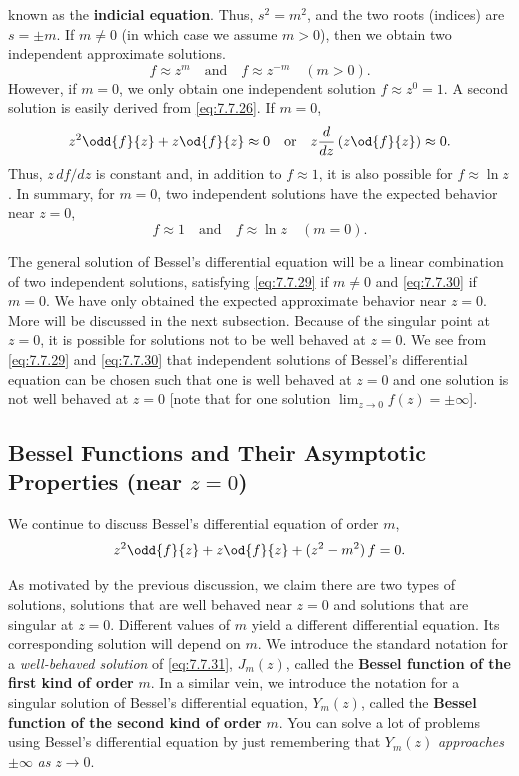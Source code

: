 known as the \textbf{indicial equation}.  Thus, $s^2 = m^2$, and the two roots (indices) are $s = \pm m$.  If $m \neq 0$ (in which case we assume $m > 0$), then we obtain two independent approximate solutions.
\begin{equation}
f \approx z^m \quad\text{and}\quad f \approx z^{-m} \quad (m > 0).
\label{eq:7.7.29}
\end{equation}
However, if $m = 0$, we only obtain one independent solution $f \approx z^0 = 1$.  A second solution is easily derived from \eqref{eq:7.7.26}.  If $m = 0$,
\[
z^2\odd{f}{z} + z\od{f}{z} \approx 0 \quad\text{or}\quad z\frac{d}{d z}\left(z\od{f}{z}\right) \approx 0.
\]
Thus, $z\,df/dz$ is constant and, in addition to $f \approx 1$, it is also possible for $f \approx \ln z$.  In summary, for $m = 0$, two independent solutions have the expected behavior near $z = 0$,
\begin{equation}
f \approx 1 \quad\text{and}\quad f \approx \ln z \quad (m = 0).
\label{eq:7.7.30}
\end{equation}

The general solution of Bessel's differential equation will be a linear combination of two independent solutions, satisfying \eqref{eq:7.7.29} if $m \neq 0$ and \eqref{eq:7.7.30} if $m = 0$.  We have only obtained the expected approximate behavior near $z = 0$.  More will be discussed in the next subsection.  Because of the singular point at $z = 0$, it is possible for solutions not to be well behaved at $z = 0$.  We see from \eqref{eq:7.7.29} and \eqref{eq:7.7.30} that independent solutions of Bessel's differential equation can be chosen such that one is well behaved at $z = 0$ and one solution is not well behaved at $z = 0$ [note that for one solution $\lim_{z\to 0}f(z) = \pm\infty$].

\subsection{Bessel Functions and Their Asymptotic Properties (near \texorpdfstring{$z = 0$}{z = 0})}
\label{sec:7.7.6}

We continue to discuss Bessel's differential equation of order $m$,
\begin{equation}
z^2\odd{f}{z} + z\od{f}{z} + (z^2 - m^2)\,f = 0.
\label{eq:7.7.31}
\end{equation}

As motivated by the previous discussion, we claim there are two types of solutions, solutions that are well behaved near $z = 0$ and solutions that are singular at $z = 0$.  Different values of $m$ yield a different differential equation.  Its corresponding solution will depend on $m$.  We introduce the standard notation for a \emph{well-behaved solution} of \eqref{eq:7.7.31}, $J_m(z)$, called the \textbf{Bessel function of the first kind of order} $m$.  In a similar vein, we introduce the notation for a singular solution of Bessel's differential equation, $Y_m(z)$, called the \textbf{Bessel function of the second kind of order} $m$.  You can solve a lot of problems using Bessel's differential equation by just remembering that $Y_m(z)$ \emph{approaches} $\pm\infty$ \emph{as} $z \to 0$.


